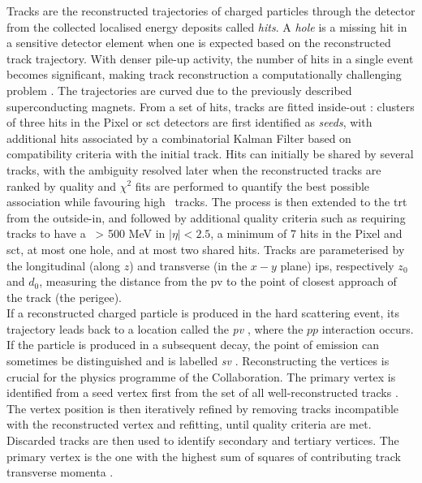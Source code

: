 Tracks are the reconstructed trajectories of charged particles through the detector from the collected localised energy deposits called \textit{hits}. A \textit{hole} is a missing hit in a sensitive detector element when one is expected based on the reconstructed track trajectory. With denser pile-up activity, the number of hits in a single event becomes significant, making track reconstruction a computationally challenging problem \cite{ATL-PHYS-PUB-2015-006, ATLAS-tracks-algo,}. The trajectories are curved due to the previously described superconducting magnets. From a set of hits, tracks are fitted inside-out \cite{ATLAS-tracks-algo}: clusters of three hits in the Pixel or \gls{sct} detectors are first identified as \textit{seeds}, with additional hits associated by a combinatorial Kalman Filter \cite{10.1115/1.3662552} based on compatibility criteria with the initial track. Hits can initially be shared by several tracks, with the ambiguity resolved later when the reconstructed tracks are ranked by quality and $\chi^2$ fits are performed to quantify the best possible association while favouring high \pt\ tracks. The process is then extended to the \gls{trt} from the outside-in, and followed by additional quality criteria such as requiring tracks to have a \pt\ > 500 MeV in $|\eta| < 2.5$, a minimum of 7 hits in the Pixel and \gls{sct}, at most one hole, and at most two shared hits. Tracks are parameterised by the longitudinal (along $z$) and transverse (in the $x-y$ plane) \glspl{ip}, respectively $z_0$ and $d_0$, measuring the distance from the \gls{pv} to the point of closest approach of the track (the perigee). \\

If a reconstructed charged particle is produced in the hard scattering event, its trajectory leads back to a location called the \textit{\gls{pv}} \cite{ATLAS:2016nnj}, where the $pp$ interaction occurs. If the particle is produced in a subsequent decay, the point of emission can sometimes be distinguished and is labelled \textit{\gls{sv}} \cite{Kostyukhin:685551}. Reconstructing the vertices is crucial for the physics programme of the Collaboration. The primary vertex is identified from a seed vertex first from the set of all well-reconstructed tracks \cite{ATL-PHYS-PUB-2015-026}. The vertex position is then iteratively refined by removing tracks incompatible with the reconstructed vertex and refitting, until quality criteria are met. Discarded tracks are then used to identify secondary and tertiary vertices. The primary vertex is the one with the highest sum of squares of contributing track transverse momenta \pt. \\


